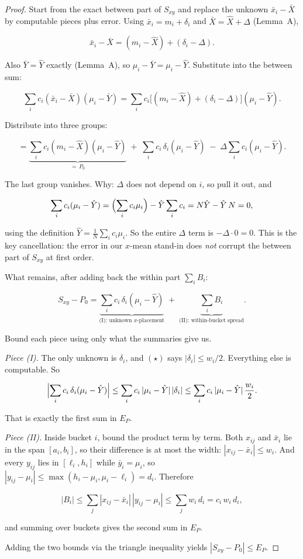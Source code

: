 \documentclass[11pt]{article}
\begin{document}
\begin{proof}
Start from the exact between part of $S_{xy}$ and replace the unknown
$\bar x_i-\bar X$ by computable pieces plus error. Using
$\bar x_i=m_i+\delta_i$ and $\bar X=\hat X+\Delta$ (Lemma~A),

\[
\bar x_i-\bar X=(m_i-\hat X)+(\delta_i-\Delta).
\]

Also $\bar Y=\hat Y$ exactly (Lemma~A), so $\mu_i-\bar Y=\mu_i-\hat Y$.
Substitute into the between sum:

\[
\sum_i c_i(\bar x_i-\bar X)(\mu_i-\bar Y)
=\sum_i c_i\bigl[(m_i-\hat X)+(\delta_i-\Delta)\bigr](\mu_i-\hat Y).
\]

Distribute into three groups:

\[
=\underbrace{\sum_i c_i(m_i-\hat X)(\mu_i-\hat Y)}_{=\,P_0}
\;+\;\sum_i c_i\,\delta_i(\mu_i-\hat Y)
\;-\;\Delta\sum_i c_i(\mu_i-\hat Y).
\]

The last group vanishes. Why: $\Delta$ does not depend on $i$, so pull
it out, and

\[
\sum_i c_i(\mu_i-\hat Y)
=\Bigl(\sum_i c_i\mu_i\Bigr)-\hat Y\sum_i c_i
=N\hat Y-\hat Y\,N
=0,
\]

using the definition $\hat Y=\frac1N\sum_i c_i\mu_i$. So the entire
$\Delta$ term is $-\Delta\cdot 0=0$. This is the key cancellation:
the error in our $x$-mean stand-in does \emph{not} corrupt the between
part of $S_{xy}$ at first order.

What remains, after adding back the within part $\sum_i B_i$:

\[
S_{xy}-P_0
=\underbrace{\sum_i c_i\,\delta_i(\mu_i-\hat Y)}_{\text{(I): unknown }x\text{-placement}}
\;+\;\underbrace{\sum_i B_i}_{\text{(II): within-bucket spread}}.
\]

Bound each piece using only what the summaries give us.

\emph{Piece (I).} The only unknown is $\delta_i$, and $(\star)$ says
$|\delta_i|\le w_i/2$. Everything else is computable. So

\[
\Bigl|\sum_i c_i\,\delta_i(\mu_i-\hat Y)\Bigr|
\le\sum_i c_i\,|\mu_i-\hat Y|\,|\delta_i|
\le\sum_i c_i\,|\mu_i-\hat Y|\,\frac{w_i}{2}.
\]

That is exactly the first sum in $E_P$.

\emph{Piece (II).} Inside bucket $i$, bound the product term by term.
Both $x_{ij}$ and $\bar x_i$ lie in the span $[a_i,b_i]$, so their
difference is at most the width: $|x_{ij}-\bar x_i|\le w_i$. And every
$y_{ij}$ lies in $[\ell_i,h_i]$ while $\bar y_i=\mu_i$, so
$|y_{ij}-\mu_i|\le\max(h_i-\mu_i,\mu_i-\ell_i)=d_i$. Therefore

\[
|B_i|\le\sum_j |x_{ij}-\bar x_i|\,|y_{ij}-\mu_i|
\le\sum_j w_i\,d_i
= c_i\,w_i\,d_i,
\]

and summing over buckets gives the second sum in $E_P$.

Adding the two bounds via the triangle inequality yields
$|S_{xy}-P_0|\le E_P$.
\end{proof}
\end{document}

